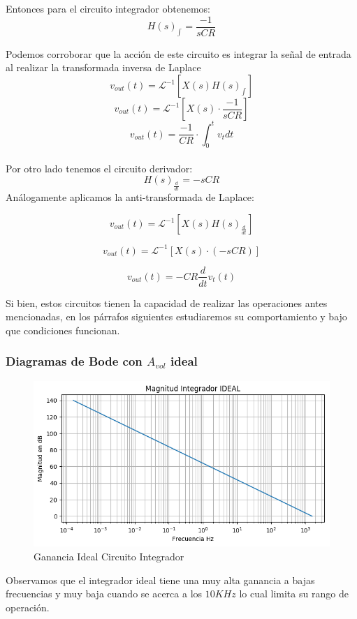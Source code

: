 \documentclass[a4paper]{article}
\begin{document}
Entonces para el circuito integrador obtenemos:
$$H(s)_{\int_{}{}} = \frac{-1}{sCR} $$

Podemos corroborar que la acción de este circuito es integrar la señal de entrada al realizar la transformada inversa de Laplace
$$v_{out}(t) = \mathcal{L}^{-1}[X(s)H(s)_{\int_{}{}}]$$
$$v_{out}(t) = \mathcal{L}^{-1}[X(s)\cdot \frac{-1}{sCR}]$$
$$v_{out}(t)= \frac{-1}{CR} \cdot \int_{0}^{t}v_t dt$$            
\\
Por otro lado tenemos el circuito derivador:
$$H(s)_{\frac{d}{dt}}=-sCR$$
Análogamente aplicamos la anti-transformada de Laplace:

$$v_{out}(t) = \mathcal{L}^{-1}[X(s)H(s)_{\frac{d}{dt}}]$$

$$v_{out}(t) = \mathcal{L}^{-1}[X(s)\cdot (-sCR)]$$

$$v_{out}(t)= -CR \frac{d}{dt}v_t(t)$$       

Si bien, estos circuitos tienen la capacidad de realizar las operaciones antes mencionadas, en los párrafos siguientes estudiaremos su comportamiento y bajo que condiciones funcionan.

\subsubsection{Diagramas de Bode con $A_{vol}$ ideal}
\begin{figure}[H]
	\centering
	\includegraphics[width=\textwidth]{Ejercicio4/BODE-IDEAL-MAGNITUD-INTEGRADOR.png}
	\caption{Ganancia Ideal Circuito Integrador}
\end{figure}

Observamos que el integrador ideal tiene una muy alta ganancia a bajas frecuencias y muy baja cuando se acerca a los $10KHz$ lo cual limita su rango de operación.
\end{document}
